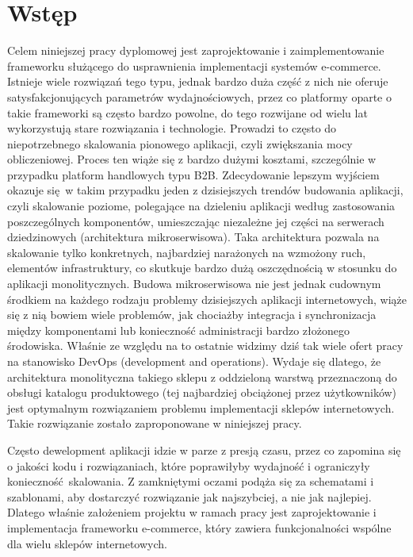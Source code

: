 \chapter{Wstęp}
\thispagestyle{chapterBeginStyle}
Celem niniejszej pracy dyplomowej jest zaprojektowanie i zaimplementowanie frameworku służącego do usprawnienia implementacji systemów e-commerce. Istnieje wiele rozwiązań tego typu, jednak bardzo duża część z nich nie oferuje satysfakcjonujących parametrów wydajnościowych, przez co platformy oparte o takie frameworki są często bardzo powolne, do tego rozwijane od wielu lat wykorzystują stare rozwiązania i technologie. Prowadzi to często do niepotrzebnego skalowania pionowego aplikacji, czyli zwiększania mocy obliczeniowej. Proces ten wiąże się z bardzo dużymi kosztami, szczególnie w przypadku platform handlowych typu B2B. Zdecydowanie lepszym wyjściem okazuje się w takim przypadku jeden z dzisiejszych trendów budowania aplikacji, czyli skalowanie poziome, polegające na dzieleniu aplikacji według zastosowania poszczególnych komponentów, umieszczając niezależne jej części na serwerach dziedzinowych (architektura mikroserwisowa). Taka architektura pozwala na skalowanie tylko konkretnych, najbardziej narażonych na wzmożony ruch, elementów infrastruktury, co skutkuje bardzo dużą oszczędnością w stosunku do aplikacji monolitycznych. Budowa mikroserwisowa nie jest jednak cudownym środkiem na każdego rodzaju problemy dzisiejszych aplikacji internetowych, wiąże się z nią bowiem wiele problemów, jak chociażby integracja i synchronizacja między komponentami lub konieczność administracji bardzo złożonego środowiska. Właśnie ze względu na to ostatnie widzimy dziś tak wiele ofert pracy na stanowisko DevOps (development and operations). Wydaje się dlatego, że architektura monolityczna takiego sklepu z oddzieloną warstwą przeznaczoną do obsługi katalogu produktowego (tej najbardziej obciążonej przez użytkowników) jest optymalnym rozwiązaniem problemu implementacji sklepów internetowych. Takie rozwiązanie zostało zaproponowane w niniejszej pracy.

Często dewelopment aplikacji idzie w parze z presją czasu, przez co zapomina  się o jakości kodu i rozwiązaniach, które poprawiłyby wydajność i ograniczyły konieczność skalowania. Z zamkniętymi oczami podąża się za schematami i szablonami, aby dostarczyć rozwiązanie jak najszybciej, a nie jak najlepiej. Dlatego właśnie założeniem projektu w ramach pracy jest zaprojektowanie i implementacja frameworku e-commerce, który zawiera funkcjonalności wspólne dla wielu sklepów internetowych.


